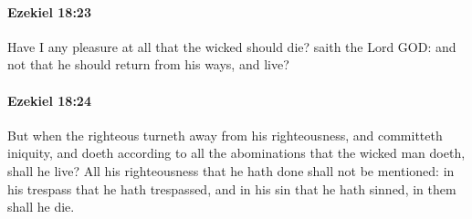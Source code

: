 		\paragraph{Ezekiel 18:23} %
			\label{EZEKIEL-18-23}

			Have I any pleasure at all that the wicked should die? saith the Lord GOD: and not that he should return from his ways, and live?


		\paragraph{Ezekiel 18:24} %
			\label{EZEKIEL-18-24}

			But when the righteous turneth away from his righteousness, and committeth iniquity, and doeth according to all the abominations that the wicked man doeth, shall he live? All his righteousness that he hath done shall not be mentioned: in his trespass that he hath trespassed, and in his sin that he hath sinned, in them shall he die.

